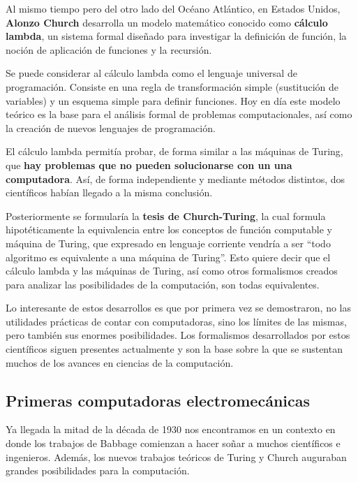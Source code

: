 Al mismo tiempo pero del otro lado del Océano Atlántico, en Estados Unidos,
\textbf{Alonzo Church} desarrolla un modelo matemático conocido como
\textbf{cálculo lambda}, un sistema formal diseñado para investigar la
definición de función, la noción de aplicación de funciones y la recursión.

Se puede considerar al cálculo lambda como el lenguaje universal de programación.
Consiste en una regla de transformación simple (sustitución de variables) y un
esquema simple para definir funciones. Hoy en día este modelo teórico es la base
para el análisis formal de problemas computacionales, así como la creación de
nuevos lenguajes de programación.

El cálculo lambda permitía probar, de forma similar a las máquinas de Turing,
que \textbf{hay problemas que no pueden solucionarse con un una computadora}.
Así, de forma independiente y mediante métodos distintos, dos científicos
habían llegado a la misma conclusión.

Posteriormente se formularía la \textbf{tesis de Church-Turing}, la cual formula
hipotéticamente la equivalencia entre los conceptos de función computable y
máquina de Turing, que expresado en lenguaje corriente vendría a ser ``todo
algoritmo es equivalente a una máquina de Turing''. Esto quiere decir que
el cálculo lambda y las máquinas de Turing, así como otros formalismos
creados para analizar las posibilidades de la computación, son todas equivalentes.
\autocite[cap. 11]{petzold_2008}

Lo interesante de estos desarrollos es que por primera vez se demostraron, no
las utilidades prácticas de contar con computadoras, sino los límites de las mismas,
pero también sus enormes posibilidades. Los formalismos desarrollados por
estos científicos siguen presentes actualmente y son la base sobre la que se
sustentan muchos de los avances en ciencias de la computación.

\subsection{Primeras computadoras electromecánicas}

Ya llegada la mitad de la década de 1930 nos encontramos en un contexto en
donde los trabajos de Babbage comienzan a hacer soñar a muchos científicos e
ingenieros. Además, los nuevos trabajos teóricos de Turing y Church auguraban
grandes posibilidades para la computación.

